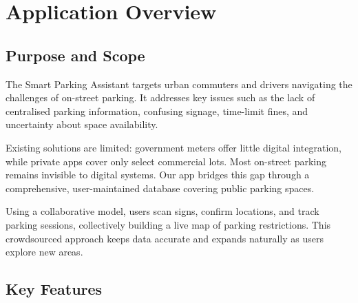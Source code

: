 \section{Application Overview}

\subsection{Purpose and Scope}

The Smart Parking Assistant targets urban commuters and drivers navigating the challenges of on-street parking. It addresses key issues such as the lack of centralised parking information, confusing signage, time-limit fines, and uncertainty about space availability.

Existing solutions are limited: government meters offer little digital integration, while private apps cover only select commercial lots. Most on-street parking remains invisible to digital systems. Our app bridges this gap through a comprehensive, user-maintained database covering public parking spaces.

Using a collaborative model, users scan signs, confirm locations, and track parking sessions, collectively building a live map of parking restrictions. This crowdsourced approach keeps data accurate and expands naturally as users explore new areas.

\subsection{Key Features}

